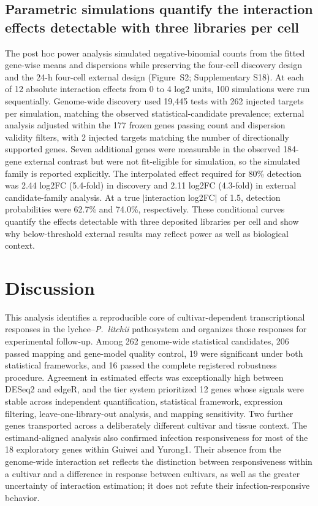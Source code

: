\documentclass[referee,pdflatex,sn-basic,Numbered]{sn-jnl}
\newcommand{\Pl}{\textit{P.~litchii}}
\begin{document}
\subsection{Parametric simulations quantify the interaction effects detectable with three libraries per cell}

The post hoc power analysis simulated negative-binomial counts from the fitted gene-wise means and dispersions while preserving the four-cell discovery design and the 24-h four-cell external design (Figure~S2; Supplementary S18). At each of 12 absolute interaction effects from 0 to 4 log2 units, 100 simulations were run sequentially. Genome-wide discovery used 19,445 tests with 262 injected targets per simulation, matching the observed statistical-candidate prevalence; external analysis adjusted within the 177 frozen genes passing count and dispersion validity filters, with 2 injected targets matching the number of directionally supported genes. Seven additional genes were measurable in the observed 184-gene external contrast but were not fit-eligible for simulation, so the simulated family is reported explicitly. The interpolated effect required for 80\% detection was 2.44 log2FC (5.4-fold) in discovery and 2.11 log2FC (4.3-fold) in external candidate-family analysis. At a true $|$interaction log2FC$|$ of 1.5, detection probabilities were 62.7\% and 74.0\%, respectively. These conditional curves quantify the effects detectable with three deposited libraries per cell and show why below-threshold external results may reflect power as well as biological context.

\section{Discussion}\label{sec:discussion}

This analysis identifies a reproducible core of cultivar-dependent transcriptional responses in the lychee--\Pl{} pathosystem and organizes those responses for experimental follow-up. Among 262 genome-wide statistical candidates, 206 passed mapping and gene-model quality control, 19 were significant under both statistical frameworks, and 16 passed the complete registered robustness procedure. Agreement in estimated effects was exceptionally high between DESeq2 and edgeR, and the tier system prioritized 12 genes whose signals were stable across independent quantification, statistical framework, expression filtering, leave-one-library-out analysis, and mapping sensitivity. Two further genes transported across a deliberately different cultivar and tissue context. The estimand-aligned analysis also confirmed infection responsiveness for most of the 18 exploratory genes within Guiwei and Yurong1. Their absence from the genome-wide interaction set reflects the distinction between responsiveness within a cultivar and a difference in response between cultivars, as well as the greater uncertainty of interaction estimation; it does not refute their infection-responsive behavior.
\end{document}
